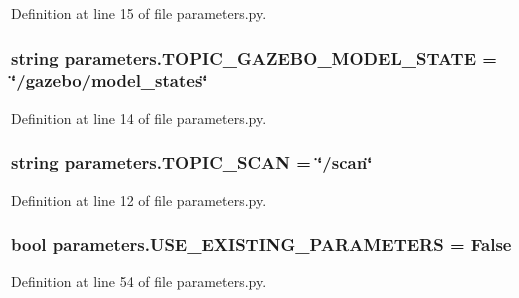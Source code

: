 Definition at line 15 of file parameters.\+py.

\subsubsection[{\texorpdfstring{T\+O\+P\+I\+C\+\_\+\+G\+A\+Z\+E\+B\+O\+\_\+\+M\+O\+D\+E\+L\+\_\+\+S\+T\+A\+TE}{TOPIC_GAZEBO_MODEL_STATE}}]{\setlength{\rightskip}{0pt plus 5cm}string parameters.\+T\+O\+P\+I\+C\+\_\+\+G\+A\+Z\+E\+B\+O\+\_\+\+M\+O\+D\+E\+L\+\_\+\+S\+T\+A\+TE = \char`\"{}/gazebo/model\+\_\+states\char`\"{}}\hypertarget{namespaceparameters_a9d4157266ec0afde91ab7d58be4f688d}{}\label{namespaceparameters_a9d4157266ec0afde91ab7d58be4f688d}


Definition at line 14 of file parameters.\+py.

\subsubsection[{\texorpdfstring{T\+O\+P\+I\+C\+\_\+\+S\+C\+AN}{TOPIC_SCAN}}]{\setlength{\rightskip}{0pt plus 5cm}string parameters.\+T\+O\+P\+I\+C\+\_\+\+S\+C\+AN = \char`\"{}/scan\char`\"{}}\hypertarget{namespaceparameters_a28de242cdbba10666eb0c95aaef6812b}{}\label{namespaceparameters_a28de242cdbba10666eb0c95aaef6812b}


Definition at line 12 of file parameters.\+py.

\subsubsection[{\texorpdfstring{U\+S\+E\+\_\+\+E\+X\+I\+S\+T\+I\+N\+G\+\_\+\+P\+A\+R\+A\+M\+E\+T\+E\+RS}{USE_EXISTING_PARAMETERS}}]{\setlength{\rightskip}{0pt plus 5cm}bool parameters.\+U\+S\+E\+\_\+\+E\+X\+I\+S\+T\+I\+N\+G\+\_\+\+P\+A\+R\+A\+M\+E\+T\+E\+RS = False}\hypertarget{namespaceparameters_a0cffcb215ac12a1700baedb1a13ec8d5}{}\label{namespaceparameters_a0cffcb215ac12a1700baedb1a13ec8d5}


Definition at line 54 of file parameters.\+py.

